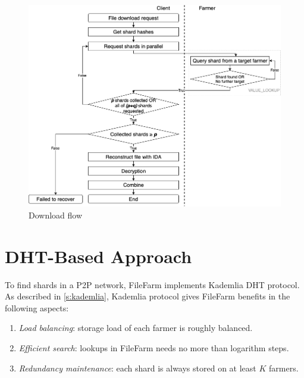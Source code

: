 \begin{figure}[!b]
\centering
  \includegraphics[width=15cm]{figures/download_flow.png}
  \caption{Download flow}
  \label{fig:downloadflow}
\end{figure}

\newpage

\section{DHT-Based Approach}
\label{s:dhtbasedapproach}

To find shards in a P2P network, FileFarm implements Kademlia DHT protocol. As described in \ref{s:kademlia}, Kademlia protocol gives FileFarm benefits in the following aspects:

\begin{enumerate}
  \item \textit{Load balancing}: storage load of each farmer is roughly balanced.
  \item \textit{Efficient search}: lookups in FileFarm needs no more than logarithm steps.
  \item \textit{Redundancy maintenance}: each shard is always stored on at least $K$ farmers.
\end{enumerate}

